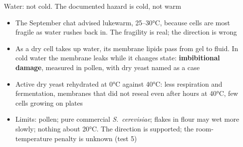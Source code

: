 \documentclass[aspectratio=169,11pt]{beamer}
\begin{document}
\begin{frame}{Water: not cold. The documented hazard is cold, not warm}
  \small
  \begin{itemize}
    \item The September chat advised lukewarm, 25--30°C, because cells are most fragile as water rushes back in. The fragility is real; the direction is wrong
    \item As a dry cell takes up water, its membrane lipids pass from gel to fluid. In cold water the membrane leaks while it changes state: \textbf{imbibitional damage}, measured in pollen, with dry yeast named as a case
    \item Active dry yeast rehydrated at 0°C against 40°C: less respiration and fermentation, membranes that did not reseal even after hours at 40°C, few cells growing on plates
    \item Limits: pollen; pure commercial \textit{S.\ cerevisiae}; flakes in flour may wet more slowly; nothing about 20°C. The direction is supported; the room-temperature penalty is unknown (test 5)
  \end{itemize}
\end{frame}
\end{document}
